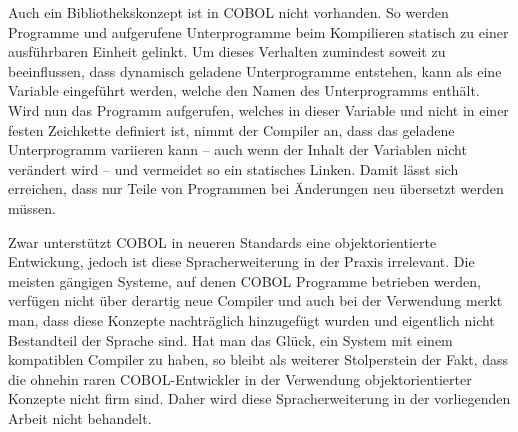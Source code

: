Auch ein Bibliothekskonzept ist in COBOL nicht vorhanden. So werden Programme und aufgerufene Unterprogramme beim Kompilieren statisch zu einer ausführbaren Einheit gelinkt. Um dieses Verhalten zumindest soweit zu beeinflussen, dass dynamisch geladene Unterprogramme entstehen, kann als  eine Variable eingeführt werden, welche den Namen des Unterprogramms enthält. Wird nun das Programm aufgerufen, welches in dieser Variable und nicht in einer festen Zeichkette definiert ist, nimmt der Compiler an, dass das geladene Unterprogramm variieren kann -- auch wenn der Inhalt der Variablen nicht verändert wird -- und vermeidet so ein statisches Linken. Damit lässt sich erreichen, dass nur Teile von Programmen bei Änderungen neu übersetzt werden müssen.

Zwar unterstützt COBOL in neueren Standards eine objektorientierte Entwickung, jedoch ist diese Spracherweiterung in der Praxis irrelevant. Die meisten gängigen Systeme, auf denen COBOL Programme betrieben werden, verfügen nicht über derartig neue Compiler und auch bei der Verwendung merkt man, dass diese Konzepte nachträglich hinzugefügt wurden und eigentlich nicht Bestandteil der Sprache sind. Hat man das Glück, ein System mit einem kompatiblen Compiler zu haben, so bleibt als weiterer Stolperstein der Fakt, dass die ohnehin raren COBOL-Entwickler in der Verwendung objektorientierter Konzepte nicht firm sind. Daher wird diese Spracherweiterung in der vorliegenden Arbeit nicht behandelt. 